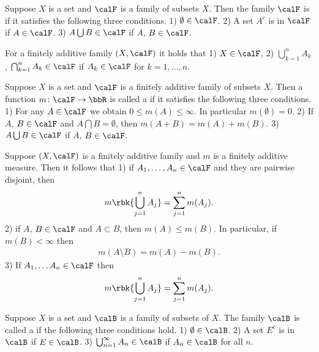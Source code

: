 \documentclass[openany, a4paper, oneside]{jsbook}
\begin{document}
\begin{defn}
 Suppose $X$ is a set and $\calF$ is a family of subsets $X$.
 Then the family $\calF$ is  if it satisfies the following three conditions.
 1) $\emptyset \in \calF$.
 2) A set $A^{c}$ is in $\calF$ if $A \in \calF$.
 3) $A \bigcup B \in \calF$ if $A$, $B \in \calF$.
\end{defn}
\begin{prop}
 For a finitely additive family $(X, \calF)$ it holds that
 1) $X \in \calF$,
 2) $\bigcup_{k=1}^n A_k$, $\bigcap_{k=1}^n A_k \in \calF$ if $A_k \in \calF$ for $k=1, \dots, n$.
\end{prop}
\begin{defn}
 Suppose $X$ is a set and $\calF$ is a finitely additive family of subsets $X$.
 Then a function $m \colon \calF \to \bbR$ is called a 
 if it satisfies the following three conditions.
 1) For any $A \in \calF$ we obtain $0 \leq m (A) \leq \infty$. In particular $m (\emptyset) = 0$.
 2) If $A$, $B \in \calF$ and $A \bigcap B = \emptyset$, then $m (A+B) = m (A) + m (B)$.
 3) $A \bigcup B \in \calF$ if $A$, $B \in \calF$.
\end{defn}
\begin{prop}
 Suppose $(X, \calF)$ is a finitely additive family and $m$ is a finitely additive measure.
 Then it follows that
 1)  if $A_1, \dots, A_n \in \calF$ and they are pairwise disjoint, then
    \begin{align}
     m \rbk{\bigcup_{j=1}^n A_j} = \sum_{j=1}^n m (A_j).
    \end{align}
 2)  if $A$, $B \in \calF$ and $A \subset B$, then $m (A) \leq m (B)$.
    In particular, if $m (B) < \infty$ then
    \begin{align}
     m (A \setminus B) = m (A) - m (B).
    \end{align}
 3)  If $A_1, \dots A_n \in \calF$ then
    \begin{align}
     m \rbk{\bigcup_{j=1}^n A_j}
     =
     \sum_{j=1}^n m (A_j).
    \end{align}
\end{prop}
\begin{defn}
 Suppose $X$ is a set and $\calB$ is a family of subsets of $X$.
 The family $\calB$ is called a 
 if the following three conditions hold.
 1) $\emptyset \in \calB$.
 2) A set $E^{c}$ is in $\calB$ if $E \in \calB$.
 3) $\bigcup_{n=1}^{\infty} A_n \in \calB$ if $A_n \in \calB$ for all $n$.
\end{defn}
\end{document}
